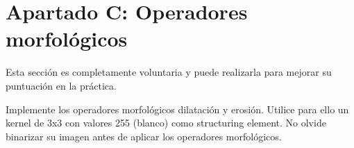 \chapter{Apartado C: \textbf{Operadores morfológicos}}
\label{chapter:tarea_c}

Esta sección es completamente voluntaria y puede realizarla para mejorar su puntuación en la práctica.

\vspace{5mm}
\begin{tcolorbox}[colback=gray!10, colframe=gray!30, coltitle=black, title=Pregunta C.1, halign=left]
Implemente los operadores morfológicos dilatación y erosión. Utilice para ello un kernel de 3x3 con valores 255 (blanco) como structuring element. No olvide binarizar su imagen antes de aplicar los operadores morfológicos.
\end{tcolorbox}